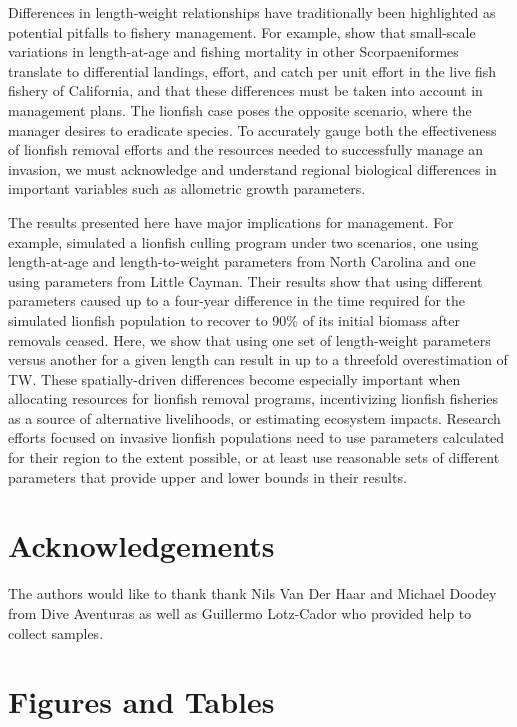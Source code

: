 \documentclass[]{article}
\theoremstyle{definition}
\theoremstyle{definition}
\theoremstyle{definition}
\theoremstyle{remark}
\begin{document}
Differences in length-weight relationships have traditionally been
highlighted as potential pitfalls to fishery management. For example,
\citet{wilson_2012} show that small-scale variations in length-at-age
and fishing mortality in other Scorpaeniformes translate to differential
landings, effort, and catch per unit effort in the live fish fishery of
California, and that these differences must be taken into account in
management plans. The lionfish case poses the opposite scenario, where
the manager desires to eradicate species. To accurately gauge both the
effectiveness of lionfish removal efforts and the resources needed to
successfully manage an invasion, we must acknowledge and understand
regional biological differences in important variables such as
allometric growth parameters.

The results presented here have major implications for management. For
example, \citet{edwards_2014} simulated a lionfish culling program under
two scenarios, one using length-at-age and length-to-weight parameters
from North Carolina and one using parameters from Little Cayman. Their
results show that using different parameters caused up to a four-year
difference in the time required for the simulated lionfish population to
recover to 90\% of its initial biomass after removals ceased. Here, we
show that using one set of length-weight parameters versus another for a
given length can result in up to a threefold overestimation of TW. These
spatially-driven differences become especially important when allocating
resources for lionfish removal programs, incentivizing lionfish
fisheries as a source of alternative livelihoods, or estimating
ecosystem impacts. Research efforts focused on invasive lionfish
populations need to use parameters calculated for their region to the
extent possible, or at least use reasonable sets of different parameters
that provide upper and lower bounds in their results.

\section{Acknowledgements}\label{acknowledgements}

The authors would like to thank thank Nils Van Der Haar and Michael
Doodey from Dive Aventuras as well as Guillermo Lotz-Cador who provided
help to collect samples.



\clearpage

\section{Figures and Tables}\label{figures-and-tables}
\end{document}
